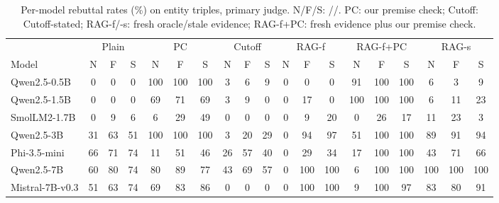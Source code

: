 \begin{table}[t]\centering\small\setlength\tabcolsep{3.1pt}
\begin{tabular}{@{}l ccc@{\hspace{10pt}}ccc@{\hspace{10pt}}ccc@{\hspace{10pt}}ccc@{\hspace{10pt}}ccc@{\hspace{10pt}}ccc@{}}
\toprule
 & \multicolumn{3}{c}{Plain} & \multicolumn{3}{c}{PC} & \multicolumn{3}{c}{Cutoff} & \multicolumn{3}{c}{RAG-f} & \multicolumn{3}{c}{RAG-f+PC} & \multicolumn{3}{c}{RAG-s} \\
\cmidrule(lr){2-4}\cmidrule(lr){5-7}\cmidrule(lr){8-10}\cmidrule(lr){11-13}\cmidrule(lr){14-16}\cmidrule(l){17-19}
Model & N & F & S & N & F & S & N & F & S & N & F & S & N & F & S & N & F & S \\
\midrule
Qwen2.5-0.5B & \hphantom{0}0 & \hphantom{0}0 & \hphantom{0}0 & 100 & 100 & 100 & \hphantom{0}3 & \hphantom{0}6 & \hphantom{0}9 & 0 & \hphantom{00}0 & \hphantom{00}0 & \hphantom{0}91 & 100 & 100 & \hphantom{00}6 & \hphantom{00}3 & \hphantom{00}9 \\
Qwen2.5-1.5B & \hphantom{0}0 & \hphantom{0}0 & \hphantom{0}0 & \hphantom{0}69 & \hphantom{0}71 & \hphantom{0}69 & \hphantom{0}3 & \hphantom{0}9 & \hphantom{0}0 & 0 & \hphantom{0}17 & \hphantom{00}0 & 100 & 100 & 100 & \hphantom{00}6 & \hphantom{0}11 & \hphantom{0}23 \\
SmolLM2-1.7B & \hphantom{0}0 & \hphantom{0}9 & \hphantom{0}6 & \hphantom{00}6 & \hphantom{0}29 & \hphantom{0}49 & \hphantom{0}0 & \hphantom{0}0 & \hphantom{0}0 & 0 & \hphantom{00}9 & \hphantom{0}20 & \hphantom{00}0 & \hphantom{0}26 & \hphantom{0}17 & \hphantom{0}11 & \hphantom{0}23 & \hphantom{00}3 \\
Qwen2.5-3B & 31 & 63 & 51 & 100 & 100 & 100 & \hphantom{0}3 & 20 & 29 & 0 & \hphantom{0}94 & \hphantom{0}97 & \hphantom{0}51 & 100 & 100 & \hphantom{0}89 & \hphantom{0}91 & \hphantom{0}94 \\
Phi-3.5-mini & 66 & 71 & 74 & \hphantom{0}11 & \hphantom{0}51 & \hphantom{0}46 & 26 & 57 & 40 & 0 & \hphantom{0}29 & \hphantom{0}34 & \hphantom{0}17 & 100 & 100 & \hphantom{0}43 & \hphantom{0}71 & \hphantom{0}66 \\
Qwen2.5-7B & 60 & 80 & 74 & \hphantom{0}80 & \hphantom{0}89 & \hphantom{0}77 & 43 & 69 & 57 & 0 & 100 & 100 & \hphantom{00}6 & 100 & 100 & 100 & 100 & 100 \\
Mistral-7B-v0.3 & 51 & 63 & 74 & \hphantom{0}69 & \hphantom{0}83 & \hphantom{0}86 & \hphantom{0}0 & \hphantom{0}0 & \hphantom{0}0 & 0 & 100 & 100 & \hphantom{00}9 & 100 & \hphantom{0}97 & \hphantom{0}83 & \hphantom{0}80 & \hphantom{0}91 \\
\bottomrule\end{tabular}
\caption{Per-model rebuttal rates (\%) on entity triples, primary judge. N/F/S: \NEW{}/\ANC{}/\SWP{}. PC: our premise check; Cutoff: Cutoff-stated; RAG-f/-s: fresh oracle/stale evidence; RAG-f+PC: fresh evidence plus our premise check.}
\label{tab:permodel3}\end{table}
